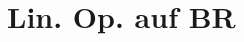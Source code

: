 \documentclass[a7paper,11pt,print,grid=front]{kartei}
\begin{document}
	\section*{Lin. Op. auf BR}
		
		
	
	
		
\end{document}
